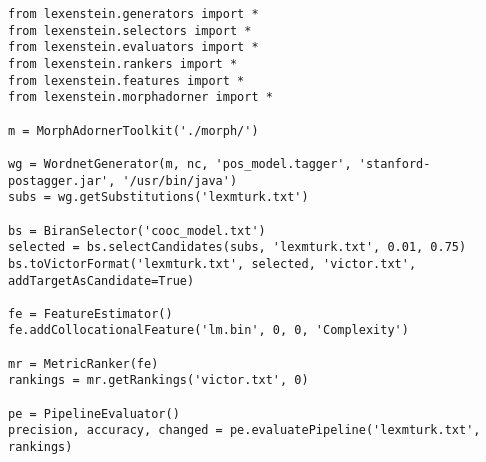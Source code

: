 \begin{lstlisting}
from lexenstein.generators import *
from lexenstein.selectors import *
from lexenstein.evaluators import *
from lexenstein.rankers import *
from lexenstein.features import *
from lexenstein.morphadorner import *

m = MorphAdornerToolkit('./morph/')

wg = WordnetGenerator(m, nc, 'pos_model.tagger', 'stanford-postagger.jar', '/usr/bin/java')
subs = wg.getSubstitutions('lexmturk.txt')

bs = BiranSelector('cooc_model.txt')
selected = bs.selectCandidates(subs, 'lexmturk.txt', 0.01, 0.75)
bs.toVictorFormat('lexmturk.txt', selected, 'victor.txt', addTargetAsCandidate=True)

fe = FeatureEstimator()
fe.addCollocationalFeature('lm.bin', 0, 0, 'Complexity')

mr = MetricRanker(fe)
rankings = mr.getRankings('victor.txt', 0)

pe = PipelineEvaluator()
precision, accuracy, changed = pe.evaluatePipeline('lexmturk.txt', rankings)
\end{lstlisting}